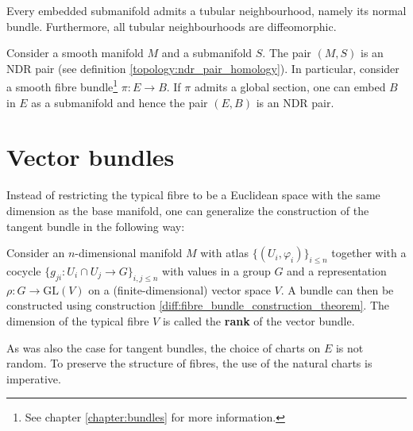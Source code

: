     \begin{theorem}\label{diff:tubular_neighbourhood_theorem}
        Every embedded submanifold admits a tubular neighbourhood, namely its normal bundle. Furthermore, all tubular neighbourhoods are diffeomorphic.
    \end{theorem}
    \begin{result}\label{diff:ndr_submanifold}
        Consider a smooth manifold $M$ and a submanifold $S$. The pair $(M,S)$ is an NDR pair (see definition \ref{topology:ndr_pair_homology}). In particular, consider a smooth fibre bundle\footnote{See chapter \ref{chapter:bundles} for more information.} $\pi:E\rightarrow B$. If $\pi$ admits a global section, one can embed $B$ in $E$ as a submanifold and hence the pair $(E,B)$ is an NDR pair.
    \end{result}

\section{Vector bundles}

    Instead of restricting the typical fibre to be a Euclidean space with the same dimension as the base manifold, one can generalize the construction of the tangent bundle in the following way:
    \begin{construct}\label{diff:vector_bundle_construction}
        Consider an $n$-dimensional manifold $M$ with atlas $\{(U_i,\varphi_i)\}_{i\leq n}$ together with a cocycle $\{g_{ji}:U_i\cap U_j\rightarrow G\}_{i,j\leq n}$ with values in a group $G$ and a representation $\rho:G\rightarrow\text{GL}(V)$ on a (finite-dimensional) vector space $V$. A bundle can then be constructed using construction \ref{diff:fibre_bundle_construction_theorem}. The dimension of the typical fibre $V$ is called the \textbf{rank} of the vector bundle.
    \end{construct}
    \begin{remark}
        As was also the case for tangent bundles, the choice of charts on $E$ is not random. To preserve the structure of fibres, the use of the natural charts is imperative.
    \end{remark}

